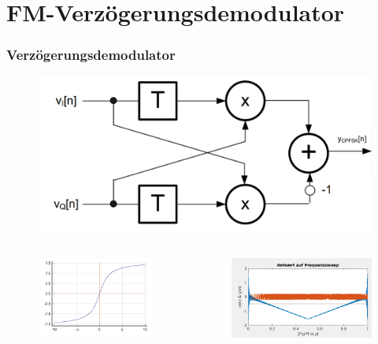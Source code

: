 \documentclass{beamer}
\begin{document}
\section{FM-Verzögerungsdemodulator}

\begin{frame}
	\frametitle{Verzögerungsdemodulator}
	\begin{figure}
		\centering
		\includegraphics[height=0.4\textheight]{images/fm_demod_no_asin}
		\label{fig:fmdemodnoasin}
	\end{figure}

	\begin{columns}
		\begin{column}{0.5\textwidth}
			\begin{figure}
				\centering
				\includegraphics[width=0.8\linewidth]{images/asin}
				\label{fig:asin}
			\end{figure}
			
		\end{column}
		\begin{column}{0.5\textwidth}
			\begin{figure}
				\centering
				\includegraphics[width=0.8\linewidth]{images/fm_demod_sweep}
				\label{fig:fmdemodsweep}
			\end{figure}
			

\end{column}
\end{columns}
\end{frame}
\end{document}
